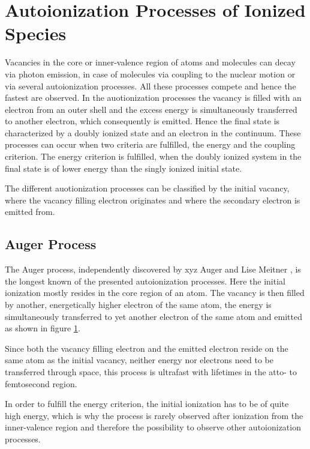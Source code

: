 \section{Autoionization Processes of Ionized Species}
Vacancies in the core or inner-valence region of atoms and molecules
can decay via photon emission, in case of molecules via coupling to
the nuclear motion or via several autoionization processes. All these
processes compete and hence the fastest are observed. In the auotionization
processes
the vacancy is filled with an electron from an outer shell and the excess
energy is simultaneously transferred to another electron, which consequently
is emitted. Hence the final state is characterized by a doubly ionized state
and an electron in the continuum. These processes can
occur when two criteria are fulfilled, the energy and the coupling criterion.
The energy criterion is fulfilled, when the doubly ionized system in the
final state is of lower energy than the singly ionized initial state.

The different auotionization processes can be classified by the initial
vacancy, where the
vacancy filling electron originates and where the secondary electron is
emitted from.

\subsection{Auger Process}
The Auger process, independently discovered by xyz Auger and Lise Meitner
\cite{}, is the longest known of the presented autoionization processes. Here
the initial ionization mostly resides in the core region of an atom. The vacancy
is then filled by another, energetically higher electron of the same atom, the
energy is simultaneously transferred to yet another electron of the same atom and
emitted as shown in figure \ref{figure:auger_process}.

\begin{figure}[h]
 \centering
% 
 \caption{}
 \label{figure:auger_process}
\end{figure}


Since both the vacancy filling electron and the emitted electron reside
on the same atom as the initial vacancy, neither energy nor electrons need
to be transferred through space, this process is ultrafast with lifetimes
in the atto- to femtosecond region.

In order to fulfill the energy criterion, the initial ionization has to
be of quite high energy, which is why the process is rarely observed after
ionization from the inner-valence region and therefore the possibility to
observe other autoionization processes.

